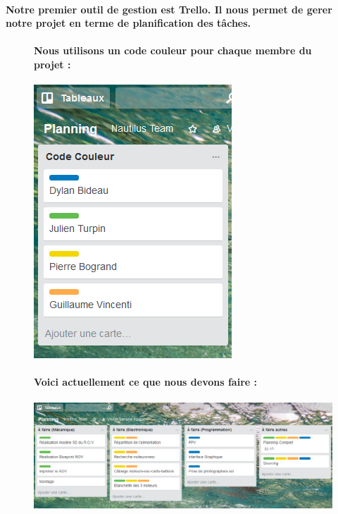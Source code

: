 \documentclass[a4paper,11pt]{report}
\begin{document}
					\paragraph{Notre premier outil de gestion est Trello. Il nous permet de gerer notre projet en terme de planification des tâches. \newline}
						\begin{figure}[!h]
							\paragraph{Nous utilisons un code couleur pour chaque membre du projet : \newline}
							\begin{center}
								\includegraphics[scale=0.5]{Illustrations/Couleur.png}
							\end{center}
						\end{figure}
						\begin{figure}[!h]
							\paragraph{\newline Voici actuellement ce que nous devons faire : \newline}
							\begin{center}
								\includegraphics[scale=0.5]{Illustrations/Planning1.png}
							\end{center}
						\end{figure}
\end{document}
